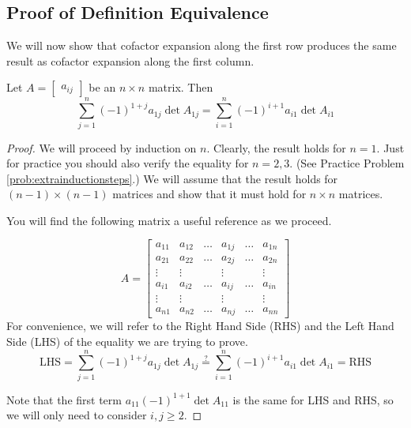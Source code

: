 \documentclass{ximera}
\begin{document}
\subsection*{Proof of Definition Equivalence}
We will now show that cofactor expansion along the first row produces the same result as cofactor expansion along the first column.
\begin{theorem}\label{th:rowcolexpequivalence}
Let $A=\begin{bmatrix}a_{ij}\end{bmatrix}$ be an $n\times n$ matrix.  Then
$$\sum_{j=1}^n(-1)^{1+j}a_{1j}\det{A_{1j}}=\sum_{i=1}^n(-1)^{i+1}a_{i1}\det{A_{i1}}$$
\end{theorem}
\begin{proof}
We will proceed by induction on $n$.  Clearly, the result holds for $n=1$.  Just for practice you should also verify the equality for $n=2, 3$. (See Practice Problem \ref{prob:extrainductionsteps}.)  We will assume that the result holds for $(n-1)\times (n-1)$ matrices and show that it must hold for $n\times n$ matrices.

You will find the following matrix a useful reference as we proceed.

$$A=\begin{bmatrix}a_{11} & a_{12} & \dots &  a_{1j} &  \dots & a_{1n}  \\
    a_{21} & a_{22} & \dots &  a_{2j} &  \dots & a_{2n}  \\
   \vdots & \vdots &  & \vdots &   & \vdots  \\
  a_{i1} & a_{i2} & \ldots &  a_{ij} &  \ldots & a_{in}\\
  \vdots & \vdots &  & \vdots &   & \vdots  \\
   a_{n1} & a_{n2} & \dots &  a_{nj} &  \dots & a_{nn}\end{bmatrix}$$
   For convenience, we will refer to the Right Hand Side (RHS) and the Left Hand Side (LHS) of the equality we are trying to prove.
   $$\text{LHS}=\sum_{j=1}^n(-1)^{1+j}a_{1j}\det{A_{1j}}\overset{?}{=}\sum_{i=1}^n(-1)^{i+1}a_{i1}\det{A_{i1}}=\text{RHS}$$
   
   Note that the first term $a_{11}(-1)^{1+1}\det{A_{11}}$ is the same for LHS and RHS, so we will only need to consider $i,j\geq 2$.
   

\end{proof}
\end{document}
